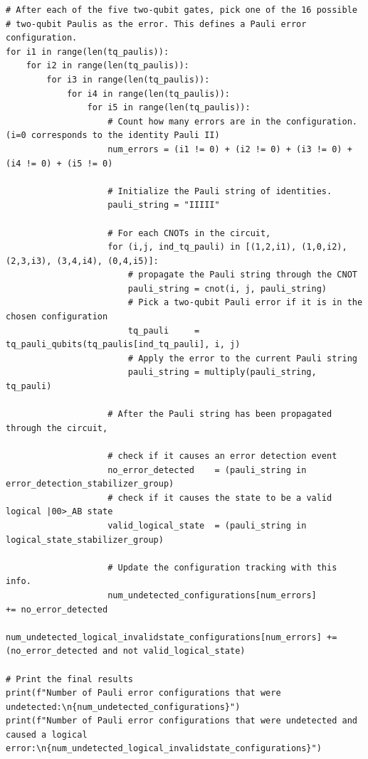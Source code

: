 \documentclass[10pt]{article}
\begin{document}
\begin{lstlisting}
# After each of the five two-qubit gates, pick one of the 16 possible
# two-qubit Paulis as the error. This defines a Pauli error configuration.
for i1 in range(len(tq_paulis)):
    for i2 in range(len(tq_paulis)):
        for i3 in range(len(tq_paulis)):
            for i4 in range(len(tq_paulis)):
                for i5 in range(len(tq_paulis)):
                    # Count how many errors are in the configuration. (i=0 corresponds to the identity Pauli II)
                    num_errors = (i1 != 0) + (i2 != 0) + (i3 != 0) + (i4 != 0) + (i5 != 0)

                    # Initialize the Pauli string of identities.
                    pauli_string = "IIIII"

                    # For each CNOTs in the circuit,
                    for (i,j, ind_tq_pauli) in [(1,2,i1), (1,0,i2), (2,3,i3), (3,4,i4), (0,4,i5)]:
                        # propagate the Pauli string through the CNOT
                        pauli_string = cnot(i, j, pauli_string)
                        # Pick a two-qubit Pauli error if it is in the chosen configuration
                        tq_pauli     = tq_pauli_qubits(tq_paulis[ind_tq_pauli], i, j)
                        # Apply the error to the current Pauli string
                        pauli_string = multiply(pauli_string, tq_pauli)

                    # After the Pauli string has been propagated through the circuit,

                    # check if it causes an error detection event
                    no_error_detected    = (pauli_string in error_detection_stabilizer_group)
                    # check if it causes the state to be a valid logical |00>_AB state
                    valid_logical_state  = (pauli_string in logical_state_stabilizer_group)

                    # Update the configuration tracking with this info.
                    num_undetected_configurations[num_errors]                      += no_error_detected
                    num_undetected_logical_invalidstate_configurations[num_errors] += (no_error_detected and not valid_logical_state)

# Print the final results
print(f"Number of Pauli error configurations that were undetected:\n{num_undetected_configurations}")
print(f"Number of Pauli error configurations that were undetected and caused a logical error:\n{num_undetected_logical_invalidstate_configurations}")
\end{lstlisting}
\end{document}
